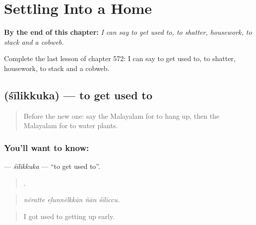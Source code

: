 
\chapter{Settling Into a Home}
\label{ch:ml-settling-into-a-home}

\begin{chapteropening}
\textbf{By the end of this chapter:} \emph{I can say to get used to, to shatter, housework, to stack and a cobweb.}

Complete the last lesson of chapter 572: I can say to get used to, to shatter, housework, to stack and a cobweb.
\end{chapteropening}

\section[\texorpdfstring{\ml{ശീലിക്കുക} (śīlikkuka)}{ശീലിക്കുക (śīlikkuka)}]{ (śīlikkuka) — to get used to}

\label{lesson:ML-C572-silikkuka}



\begin{quote}
Before the new one: say the Malayalam for to hang up, then the Malayalam for to water plants.
\end{quote}

\subsection*{You'll want to know: }
\textbf{} — \emph{śīlikkuka} — \textquotedblleft{}to get used to\textquotedblright{}.

\begin{quote}
   .
\end{quote}

\begin{quote}
\emph{nēratte eḻunnēlkkān ñān śīliccu.}
\end{quote}

\begin{quote}
I got used to getting up early.
\end{quote}

